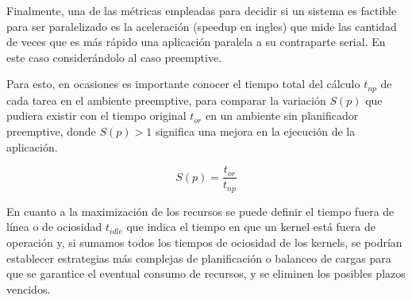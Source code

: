 Finalmente, una de las métricas empleadas para decidir si un sistema es factible para ser paralelizado es la aceleración (speedup en ingles) que mide las cantidad de veces que es más rápido una aplicación paralela a su contraparte serial. En este caso considerándolo al caso preemptive.

Para esto, en ocasiones es importante conocer el tiempo total del cálculo \textit{$t_{np}$} de cada tarea en el ambiente preemptive, para comparar la variación \textit{$S(p)$} que pudiera existir con el tiempo original \textit{$t_{or}$} en un ambiente sin planificador preemptive, donde \textit{$S(p) > 1$} significa una mejora en la ejecución de la aplicación.

\begin{equation}
S(p)=\frac{t_{or}}{t_{np}}
\end{equation}

En cuanto a la maximización de los recursos se puede definir el tiempo fuera de línea o de ociosidad \textit{$t_{idle}$} que indica el tiempo en que un kernel está fuera de operación y, si sumamos todos los tiempos de ociosidad de los kernels, se podrían
establecer estrategias más complejas de planificación o balanceo de cargas para que se garantice el eventual consumo de recursos, y se eliminen los posibles plazos vencidos.
\newline